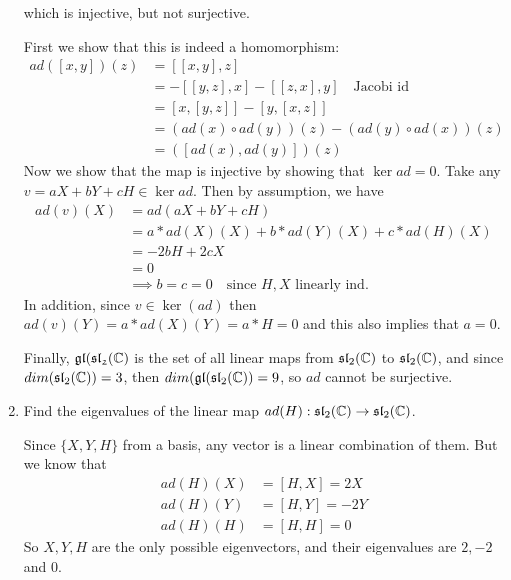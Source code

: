 \documentclass[12pt,onecolumn]{article}
\begin{document}
\begin{exercise}
\begin{enumerate}[label=(\alph*)]
    which is injective, but not surjective.
    \begin{answer}
    First we show that this is indeed a homomorphism:
    \begin{align*}
        ad([x,y])(z) &= [[x,y], z] \\
        &= -[[y,z],x] -[[z,x],y]\quad \text{Jacobi id}\\
        &= [x,[y,z]] - [y,[x,z]] \\
        &= (ad(x) \circ ad(y))(z) - (ad(y) \circ ad(x))(z) \\
        &= ([ad(x), ad(y)])(z)
    \end{align*}
    Now we show that the map is injective by showing that $\ker{ad} = 0$. Take any $v = aX + bY + cH \in \ker{ad}$. Then by assumption, we have
    \begin{align*}
        ad(v)(X) &= ad( aX + bY + cH ) \\
        &= a*ad(X)(X) + b*ad(Y)(X) + c*ad(H)(X) \\
        &= -2b H + 2cX \\
        &= 0 \\
        &\implies b=c=0 \quad \text{since $H,X$ linearly ind.}
    \end{align*}
    In addition, since $v \in \ker(ad)$ then $ad(v)(Y) = a*ad(X)(Y) = a*H = 0$ and this also implies that $a = 0$. \par
    Finally, $\mathfrak{gl}(\mathfrak{{sl}_2(\operatorname{\mathbb{C}})}$ is the set of all linear maps from $\mathfrak{sl}_2(\operatorname{\mathbb{C}})$ to $\mathfrak{sl}_2(\operatorname{\mathbb{C}})$, and since $dim(\mathfrak{sl}_2(\operatorname{\mathbb{C}}))=3$, then $dim(\mathfrak{gl}(\mathfrak{sl}_2(\operatorname{\mathbb{C}})) = 9$, so $ad$ cannot be surjective.
    \end{answer}
    \item Find the eigenvalues of the linear map $ad(H): \mathfrak{sl}_2(\operatorname{\mathbb{C}}) \rightarrow \mathfrak{sl}_2(\operatorname{\mathbb{C}})$.
    \begin{answer}
    Since $\{X,Y,H\}$ from a basis, any vector is a linear combination of them. But we know that 
    \begin{align*}
        ad(H)(X) &= [H,X] = 2X \\
        ad(H)(Y) &= [H,Y] = -2Y \\
        ad(H)(H) &= [H,H] = 0
    \end{align*}
    So $X,Y,H$ are the only possible eigenvectors, and their eigenvalues are $2,-2$ and $0$.
    \end{answer}
\end{enumerate}
\end{exercise}
\end{document}
